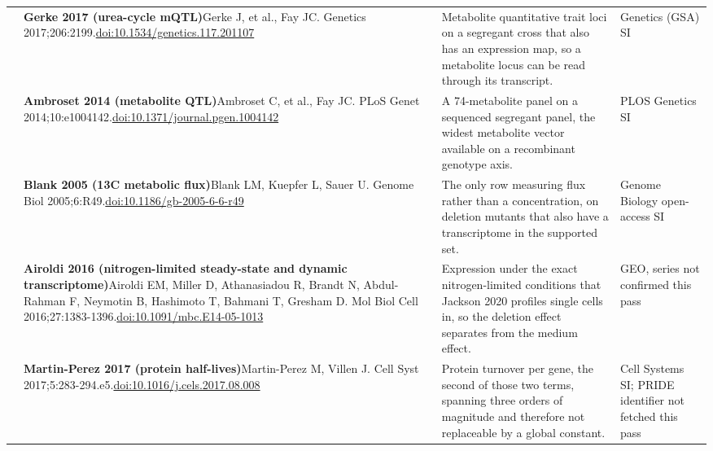 \begin{landscape}
\begin{longtable}{@{}r@{\hspace{4pt}} L{86mm} L{92mm} L{62mm}@{}}
 & \textbf{Gerke 2017 (urea-cycle mQTL)}\newline Gerke J, et al., Fay JC. Genetics 2017;206:2199.\newline \href{https://doi.org/10.1534/genetics.117.201107}{doi:10.1534/\allowbreak genetics.117.201107} & Metabolite quantitative trait loci on a segregant cross that also has an expression map, so a metabolite locus can be read through its transcript. & Genetics (GSA) SI \\
 & \textbf{Ambroset 2014 (metabolite QTL)}\newline Ambroset C, et al., Fay JC. PLoS Genet 2014;10:e1004142.\newline \href{https://doi.org/10.1371/journal.pgen.1004142}{doi:10.1371/\allowbreak journal.pgen.1004142} & A 74-metabolite panel on a sequenced segregant panel, the widest metabolite vector available on a recombinant genotype axis. & PLOS Genetics SI \\
 & \textbf{Blank 2005 (13C metabolic flux)}\newline Blank LM, Kuepfer L, Sauer U. Genome Biol 2005;6:R49.\newline \href{https://doi.org/10.1186/gb-2005-6-6-r49}{doi:10.1186/\allowbreak gb-2005-6-6-r49} & The only row measuring flux rather than a concentration, on deletion mutants that also have a transcriptome in the supported set. & Genome Biology open-access SI \\
 & \textbf{Airoldi 2016 (nitrogen-limited steady-state and dynamic transcriptome)}\newline Airoldi EM, Miller D, Athanasiadou R, Brandt N, Abdul-Rahman F, Neymotin B, Hashimoto T, Bahmani T, Gresham D. Mol Biol Cell 2016;27:1383-1396.\newline \href{https://doi.org/10.1091/mbc.E14-05-1013}{doi:10.1091/\allowbreak mbc.E14-05-1013} & Expression under the exact nitrogen-limited conditions that Jackson 2020 profiles single cells in, so the deletion effect separates from the medium effect. & GEO, series not confirmed this pass \\
 & \textbf{Martin-Perez 2017 (protein half-lives)}\newline Martin-Perez M, Villen J. Cell Syst 2017;5:283-294.e5.\newline \href{https://doi.org/10.1016/j.cels.2017.08.008}{doi:10.1016/\allowbreak j.cels.2017.08.008} & Protein turnover per gene, the second of those two terms, spanning three orders of magnitude and therefore not replaceable by a global constant. & Cell Systems SI; PRIDE identifier not fetched this pass \\

\end{longtable}
\end{landscape}
